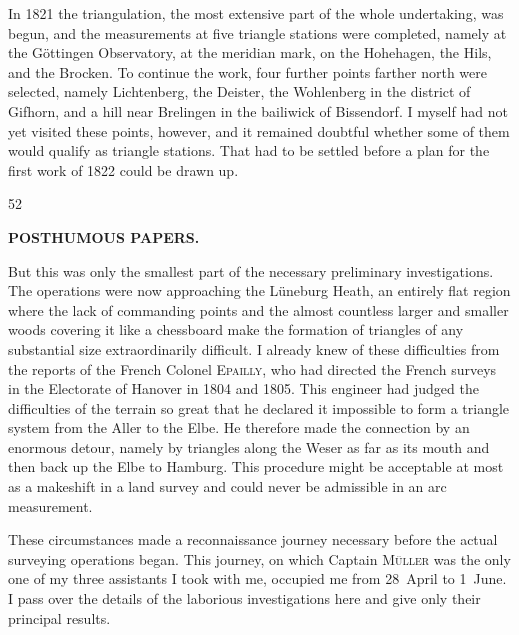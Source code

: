 \par\noindent\hspace*{\parindent}In 1821 the triangulation, the most extensive part of the whole undertaking,
was begun, and the measurements at five triangle stations were completed,
namely at the Göttingen Observatory, at the meridian mark, on the Hohehagen,
the Hils, and the Brocken. To continue the work, four further points farther
north were selected, namely Lichtenberg, the Deister, the Wohlenberg in the
district of Gifhorn, and a hill near Brelingen in the bailiwick of Bissendorf.
I myself had not yet visited these points, however, and it remained doubtful
whether some of them would qualify as triangle stations. That had to be settled
before a plan for the first work of 1822 could be drawn up.

\par\smallskip
\noindent\hspace*{.030\linewidth}{\footnotesize IX.}\hfill{\small 52}\hspace*{.137\linewidth}\par
\clearpage

\noindent{}\hfill{\small\textbf{POSTHUMOUS PAPERS.}}\hfill\null\par\medskip
\par\noindent\hspace*{\parindent}But this was only the smallest part of the necessary preliminary
investigations. The operations were now approaching the Lüneburg Heath,
an entirely flat region where the lack of commanding points and the almost
countless larger and smaller woods covering it like a chessboard make the
formation of triangles of any substantial size extraordinarily difficult. I already
knew of these difficulties from the reports of the French Colonel \textsc{Epailly},
who had directed the French surveys in the Electorate of Hanover in 1804
and 1805. This engineer had judged the difficulties of the terrain so great
that he declared it impossible to form a triangle system from the Aller to
the Elbe. He therefore made the connection by an enormous detour, namely
by triangles along the Weser as far as its mouth and then back up the Elbe
to Hamburg. This procedure might be acceptable at most as a makeshift in
a land survey and could never be admissible in an arc measurement.

\par\noindent\hspace*{\parindent}These circumstances made a reconnaissance journey necessary before
the actual surveying operations began. This journey, on which Captain
\textsc{Müller} was the only one of my three assistants I took with me, occupied me
from 28~April to 1~June. I pass over the details of the laborious investigations
here and give only their principal results.


